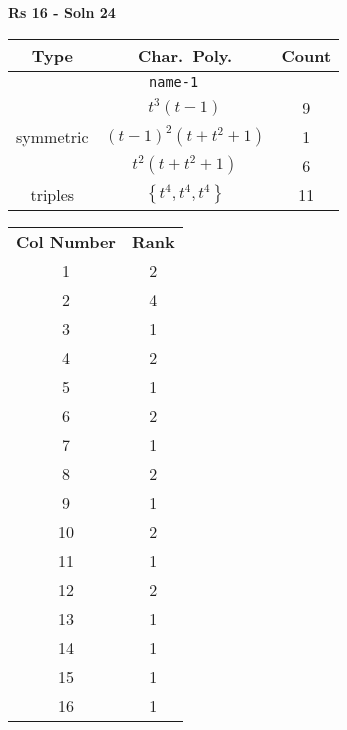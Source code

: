 \documentclass{article}
\begin{document}
    \textbf{Rs 16 - Soln 24}
    \begin{table}
    \begin{tabular}{|c|c|c|}
    \hline
    \textbf{Type} & \textbf{Char.~Poly.} & \textbf{Count} \\
    \hline \multicolumn{3}{|c|}{\texttt{name-1}} \\ \hline
    \multirow{3}{*}{symmetric}
    & $t^3(t - 1)$ & 9 \\
    & $(t - 1)^2(t + t^2 + 1)$ & 1 \\
    & $t^2(t + t^2 + 1)$ & 6 \\
    \hline
    \multirow{1}{*}{triples}
    & $\left\{t^4,t^4,t^4\right\}$ & 11 \\
    \hline
    \end{tabular}
    \end{table}
    \begin{table}
    \begin{tabular}{|c|c|}
    \hline
    \textbf{Col Number} & \textbf{Rank}\\
    1 & 2 \\ 
    2 & 4 \\ 
    3 & 1 \\ 
    4 & 2 \\ 
    5 & 1 \\ 
    6 & 2 \\ 
    7 & 1 \\ 
    8 & 2 \\ 
    9 & 1 \\ 
    10 & 2 \\ 
    11 & 1 \\ 
    12 & 2 \\ 
    13 & 1 \\ 
    14 & 1 \\ 
    15 & 1 \\ 
    16 & 1 \\ 
    \hline
    \end{tabular}
    \end{table}
    \newpage
\end{document}
